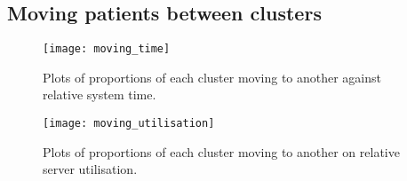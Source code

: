 \subsection{Moving patients between clusters}\label{subsec:moving}

\begin{figure}
    \centering
    \texttt{[image: moving\_time]}
    \caption{%
        Plots of proportions of each cluster moving to another against relative
        system time.
    }\label{fig:moving_time}
\end{figure}

\begin{figure}
    \centering
    \texttt{[image: moving\_utilisation]}
    \caption{%
        Plots of proportions of each cluster moving to another on relative
        server utilisation.
    }\label{fig:moving_utilisation}
\end{figure}
